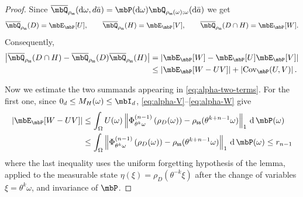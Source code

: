\documentclass[a4paper]{article}
\numberwithin{equation}{section}   %
\theoremstyle{plain}   %
\theoremstyle{plain}   %
\theoremstyle{examplestyle}
\DeclareMathOperator{\pr}{\mbP}           %
\newcommand{\s}{\rho_{\mathsf{ss}}}     %
\newcommand{\dee}{\mathrm{d}}           %
\begin{document}
\begin{proof}
            Since $\overline\mbQ_{\s}(\dee\omega, d\bar{a}) = \pr(\dee\omega)\mbQ_{\s(\omega);\omega}(\dee\bar{a})$ we get
            \[
                \overline\mbQ_{\s}(D)
                =
                \mbE_{\pr}[U],
                \qquad
                \overline\mbQ_{\s}(H)
                =
                \mbE_{\pr}[V],
                \qquad
                \overline\mbQ_{\s}(D\cap H)
                =
                \mbE_{\pr}[W].
            \]
            Consequently,
            \begin{align}
                \left|
                    \overline\mbQ_{\s}(D\cap H)
                    -
                    \overline\mbQ_{\s}(D)
                    \overline\mbQ_{\s}(H)
                \right|
                &=
                \left|
                    \mbE_{\pr}[W]
                    -
                    \mbE_{\pr}[U]
                    \mbE_{\pr}[V]
                \right|
                \notag
                \\
                &\le
                \left|
                    \mbE_{\pr}[W-UV]
                \right|
                +
                \left|
                    \mathrm{Cov}_{\pr}(U,V)
                \right|.
                \label{eq:alpha-two-terms}
            \end{align}
        
            Now we estimate the two summands appearing in \eqref{eq:alpha-two-terms}.
            For the first one, since \(0_d\le M_H(\omega)\le\mbI_d\), \eqref{eq:alpha-V}--\eqref{eq:alpha-W} give
            \begin{align*}
                \left|
                    \mbE_{\pr}[W-UV]
                \right|
                &\le
                \int_\Omega
                U(\omega)
                \left\|
                    \Phi_{\theta^k\omega}^{(n-1)}
                    \left(\rho_D(\omega)\right)
                    -
                    \s(\theta^{k+n-1}\omega)
                \right\|_1
                \,\dee\pr(\omega)
                \\
                &\le
                \int_\Omega
                \left\|
                    \Phi_{\theta^k\omega}^{(n-1)}
                    \left(\rho_D(\omega)\right)
                    -
                    \s(\theta^{k+n-1}\omega)
                \right\|_1
                \,\dee\pr(\omega)
                \le r_{n-1}
            \end{align*}
            where the last inequality uses the uniform forgetting hypothesis of the lemma, applied to the measurable state $\eta(\xi)=\rho_D(\theta^{-k}\xi)$ after the change of variables $\xi=\theta^k\omega$, and invariance of $\pr$. 
        

\end{proof}
\end{document}
